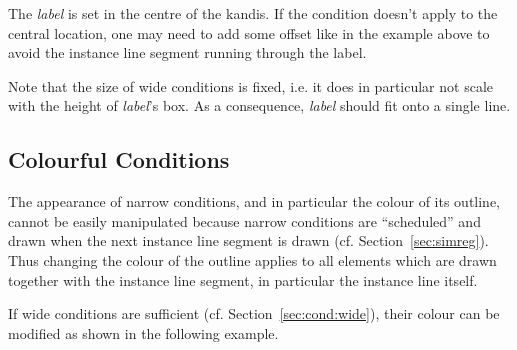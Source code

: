 \documentclass{article}
\newcommand{\var}[1]{\textit{#1}}
\begin{document}
The \var{label} is set in the centre of the kandis.  If the condition doesn't
apply to the central location, one may need to add some offset like in the
example above to avoid the instance line segment running through the label.  

Note that the size of wide conditions is fixed, i.e. it does in particular not
scale with the height of \var{label}'s box.
%
As a consequence, \var{label} should fit onto a single line.

\subsection{Colourful Conditions}
\label{sec:cond:colour}

The appearance of 
narrow conditions, and in particular the colour of its outline, cannot be
easily manipulated because narrow conditions are ``scheduled'' and drawn when
the next instance line segment is drawn (cf.  Section~\ref{sec:simreg}).
%
Thus changing the colour of the outline applies to all elements which are
drawn together with the instance line segment, in particular the instance line
itself.

If 
wide conditions are sufficient (cf. Section~\ref{sec:cond:wide}), their colour
can be modified as shown in the following example.
\end{document}
